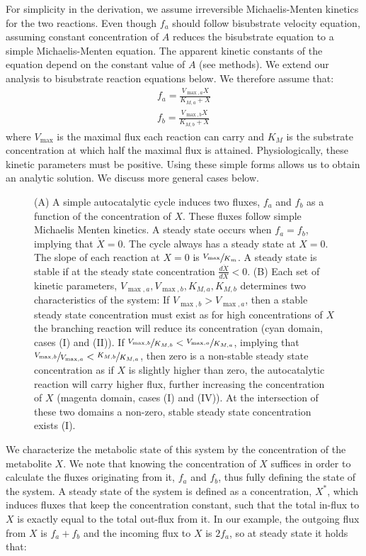 For simplicity in the derivation, we assume irreversible Michaelis-Menten kinetics for the two reactions.
Even though $f_a$ should follow bisubstrate velocity equation, assuming constant concentration of $A$ reduces the bisubstrate equation to a simple Michaelis-Menten equation.
The apparent kinetic constants of the equation depend on the constant value of $A$ (see methods).
We extend our analysis to bisubstrate reaction equations below.
We therefore assume that:
    \begin{eqnarray*}
      f_a = \frac{V_{\max,a}X}{K_{M,a}+X} \\
      f_b = \frac{V_{\max,b}X}{K_{M,b}+X}
    \end{eqnarray*}
    where $V_{\max}$ is the maximal flux each reaction can carry and $K_M$ is the substrate concentration at which half the maximal flux is attained.
    Physiologically, these kinetic parameters must be positive.
    Using these simple forms allows us to obtain an analytic solution.
    We discuss more general cases below.
    \begin{figure}[!htb]
      
      \caption{\label{fig:simplecycle}
        (A) A simple autocatalytic cycle induces two fluxes, $f_a$ and $f_b$ as a function of the concentration of $X$.
        These fluxes follow simple Michaelis Menten kinetics.
        A steady state occurs when $f_a=f_b$, implying that $\dot{X}=0$.
        The cycle always has a steady state at $X=0$.
        The slope of each reaction at $X=0$ is $\sfrac{V_{\max}}{K_m}$.
        A steady state is stable if at the steady state concentration $\frac{d\dot{X}}{dX}<0$.
        (B) Each set of kinetic parameters, $V_{\max,a},V_{\max,b},K_{M,a},K_{M,b}$ determines two characteristics of the system:
        If $V_{\max,b}>V_{\max,a}$, then a stable steady state concentration must exist as for high concentrations of $X$ the branching reaction will reduce its concentration (cyan domain, cases (I) and (II)).
        If $\sfrac{V_{\max,b}}{K_{M,b}}<\sfrac{V_{\max,a}}{K_{M,a}}$, implying that $\sfrac{V_{\max,b}}{V_{\max,a}}<\sfrac{K_{M,b}}{K_{M,a}}$, then zero is a non-stable steady state concentration as if $X$ is slightly higher than zero, the autocatalytic reaction will carry higher flux, further increasing the concentration of $X$ (magenta domain, cases (I) and (IV)).
    At the intersection of these two domains a non-zero, stable steady state concentration exists (I).}
    \end{figure}

    We characterize the metabolic state of this system by the concentration of the metabolite $X$.
    We note that knowing the concentration of $X$ suffices in order to calculate the fluxes originating from it, $f_a$ and $f_b$, thus fully defining the state of the system.
    A steady state of the system is defined as a concentration, $X^*$, which induces fluxes that keep the concentration constant, such that the total in-flux to $X$ is exactly equal to the total out-flux from it.
    In our example, the outgoing flux from $X$ is $f_a+f_b$ and the incoming flux to $X$ is $2f_a$, so at steady state it holds that:

